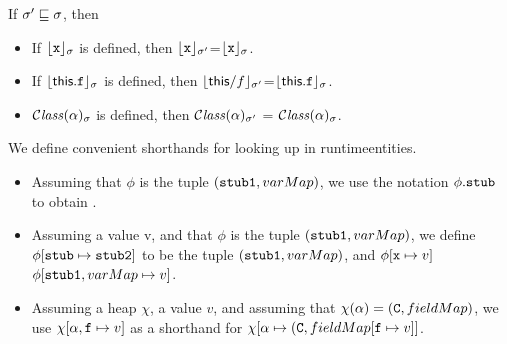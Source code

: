 \begin{lemma}
If $\sigma'  \sqsubseteq \sigma$, then

\begin{itemize}
\item
If ${\lfloor{ {{\mbox{\tt{x}}}}}\rfloor_{\sigma}}$ is defined, then ${\lfloor{ {{\mbox{\tt{x}}}}}\rfloor_{\sigma'}}$=${\lfloor{ {{\mbox{\tt{x}}}}}\rfloor_{\sigma}}$.
\item
If ${\lfloor{ {{\bf{\sf {this}}}.{\mbox{\tt{f}}}}}\rfloor_{\sigma}}$ is defined, then ${\lfloor{ {{\bf{\sf {this}}}/f}}\rfloor_{\sigma'}}$=${\lfloor{ {{\bf{\sf {this}}}.{\mbox{\tt{f}}}}}\rfloor_{\sigma}}$.
\item
${\mathcal C}{\mathit{lass}}(\alpha)_{\sigma} $  is defined, then  ${\mathcal C}{\mathit{lass}}(\alpha)_{\sigma'} $  = ${\mathcal C}{\mathit{lass}}(\alpha)_{\sigma} $. 
\end{itemize}
\end{lemma}

\begin{definition}
We define convenient shorthands for looking up in  runtimeentities. 
\begin{itemize}
\item
Assuming that $\phi$ is the tuple  $({\mbox{\tt{stub1}}}, varMap)$, we use the notation  $\phi.{\mbox{\tt{stub}}}$ to obtain .
\item
Assuming a value v, and that $\phi$ is the tuple  $({\mbox{\tt{stub1}}}, varMap)$, we define $\phi[{\mbox{\tt{stub}}}\mapsto{\mbox{\tt{stub2}}}]$ to be the tuple   
$({\mbox{\tt{stub1}}}, varMap)$, and   $\phi[{\mbox{\tt{x}}} \mapsto v]$    $\phi[{\mbox{\tt{stub1}}}, varMap\mapsto v]$.
\item
Assuming a heap $\chi$, a value $v$, and assuming that $\chi(\alpha)=({\mbox{\tt{C}}}, fieldMap)$,
we use $\chi[\alpha,{\mbox{\tt{f}}} \mapsto v]$ as a shorthand for $\chi[\alpha \mapsto ({\mbox{\tt{C}}}, fieldMap[{\mbox{\tt{f}}} \mapsto v]]$.
\end{itemize}

\end{definition}



